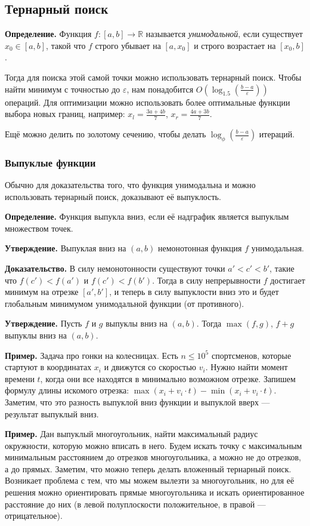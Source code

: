 \subsection{Тернарный поиск}
\textbf{Определение.} Функция $f: [a, b] \to \mathbb R$ называется \textit{унимодальной}, если существует $x_0 \in [a, b]$, такой что $f$ строго убывает на $[a, x_0]$ и строго возрастает на $[x_0, b]$.

Тогда для поиска этой самой точки можно использовать тернарный поиск.
Чтобы найти минимум с точностью до $\varepsilon$, нам понадобится $O \left( \log_{1.5} \left( \frac{b - a}{\varepsilon} \right) \right)$ операций.
Для оптимизации можно использовать более оптимальные функции выбора новых границ, например: $x_l = \frac{3a + 4b}{7}$, $x_r = \frac{4a + 3b}{7}$.

Ещё можно делить по золотому сечению, чтобы делать $\log_\phi \left( \frac{b - a}{\varepsilon} \right)$ итераций.

\subsubsection{Выпуклые функции}
Обычно для доказательства того, что функция унимодальна и можно использовать тернарный поиск, доказывают её выпуклость.

\textbf{Определение.} Функция выпукла вниз, если её надграфик является выпуклым множеством точек.

\textbf{Утверждение.} Выпуклая вниз на $(a, b)$ немонотонная функция $f$ унимодальная.

\textbf{Доказательство.} В силу немонотонности существуют точки $a' < c' < b'$, такие что $f(c') < f(a')$ и $f(c') < f(b')$.
Тогда в силу непрерывности $f$ достигает минимум на отрезке $[a', b']$, и теперь в силу выпуклости вниз это и будет глобальным минимумом унимодальной функции (от противного).

\textbf{Утверждение.} Пусть $f$ и $g$ выпуклы вниз на $(a, b)$.
Тогда $\max(f, g)$, $f + g$ выпуклы вниз на $(a, b)$.

\textbf{Пример.} Задача про гонки на колесницах.
Есть $n \le 10^5$ спортсменов, которые стартуют в координатах $x_i$ и движутся со скоростью $v_i$.
Нужно найти момент времени $t$, когда они все находятся в минимально возможном отрезке.
Запишем формулу длины искомого отрезка: $\max(x_i + v_i \cdot t) - \min(x_i + v_i \cdot t)$.
Заметим, что это разность выпуклой вниз функции и выпуклой вверх --- результат выпуклый вниз.

\textbf{Пример.} Дан выпуклый многоугольник, найти максимальный радиус окружности, которую можно вписать в него.
Будем искать точку с максимальным минимальным расстоянием до отрезков многоугольника, а можно не до отрезков, а до прямых.
Заметим, что можно теперь делать вложенный тернарный поиск.
Возникает проблема с тем, что мы можем вылезти за многоугольник, но для её решения можно ориентировать прямые многоугольника и искать ориентированное расстояние до них (в левой полуплоскости положительное, в правой --- отрицательное).

